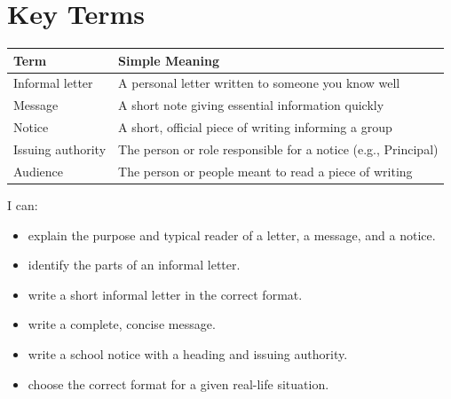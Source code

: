 \section{Key Terms}
\begin{table}[h!]
\centering
\begin{tabular}{|l|p{9cm}|}
\hline
\textbf{Term} & \textbf{Simple Meaning} \\
\hline
Informal letter & A personal letter written to someone you know well \\
Message & A short note giving essential information quickly \\
Notice & A short, official piece of writing informing a group \\
Issuing authority & The person or role responsible for a notice (e.g., Principal) \\
Audience & The person or people meant to read a piece of writing \\
\hline
\end{tabular}
\end{table}

\begin{selfcheck}
I can:
\begin{itemize}
    \item explain the purpose and typical reader of a letter, a message, and a notice.
    \item identify the parts of an informal letter.
    \item write a short informal letter in the correct format.
    \item write a complete, concise message.
    \item write a school notice with a heading and issuing authority.
    \item choose the correct format for a given real-life situation.
\end{itemize}
\end{selfcheck}